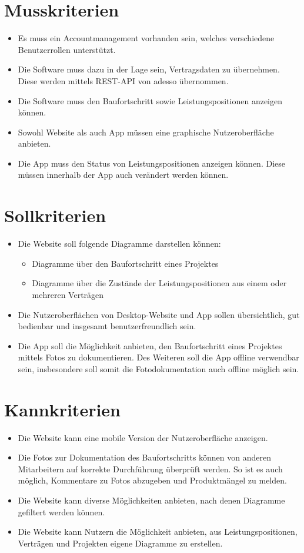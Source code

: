 \section{Musskriterien}
\begin{itemize}
	\item Es muss ein Accountmanagement vorhanden sein, welches verschiedene Benutzerrollen unterstützt.
	\item Die Software muss dazu in der Lage sein, Vertragsdaten zu übernehmen. Diese werden mittels REST-API von adesso übernommen.
	\item Die Software muss den Baufortschritt sowie Leistungspositionen anzeigen können.
	\item Sowohl Website als auch App müssen eine graphische Nutzeroberfläche anbieten.
	\item Die App muss den Status von Leistungspositionen anzeigen können.
	Diese müssen innerhalb der App auch verändert werden können.
\end{itemize}

\section{Sollkriterien}
\begin{itemize}
	\item Die Website soll folgende Diagramme darstellen können:
		\begin{itemize}
		\item Diagramme über den Baufortschritt eines Projektes
		\item Diagramme über die Zustände der Leistungspositionen aus einem oder mehreren Verträgen
		\end{itemize}
	\item Die Nutzeroberflächen von Desktop-Website und App sollen übersichtlich, gut bedienbar und insgesamt benutzerfreundlich sein.
	\item Die App soll die Möglichkeit anbieten, den Baufortschritt eines Projektes mittels Fotos zu dokumentieren.
	Des Weiteren soll die App offline verwendbar sein, insbesondere soll somit die Fotodokumentation auch offline möglich sein.
\end{itemize}

\section{Kannkriterien}
\begin{itemize}
	\item Die Website kann eine mobile Version der Nutzeroberfläche anzeigen.
	\item Die Fotos zur Dokumentation des Baufortschritts können von anderen Mitarbeitern auf korrekte Durchführung überprüft werden.
	So ist es auch möglich, Kommentare zu Fotos abzugeben und Produktmängel zu melden.
	\item Die Website kann diverse Möglichkeiten anbieten, nach denen Diagramme gefiltert werden können.
	\item Die Website kann Nutzern die Möglichkeit anbieten, aus Leistungspositionen, Verträgen und Projekten eigene Diagramme zu erstellen.
\end{itemize}

